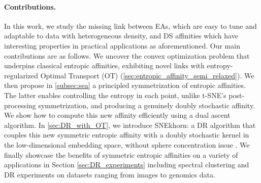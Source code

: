 \paragraph{Contributions.} In this work, we study the missing
link between EAs, which are easy to tune and adaptable to data with heterogeneous density, and DS affinities which have interesting properties in practical applications as aforementioned. 
Our main contributions are as follows. We uncover the convex
optimization problem that underpins classical entropic affinities, exhibiting
novel links with entropy-regularized Optimal Transport (OT) (\cref{sec:entropic_affinity_semi_relaxed}). We then propose in \cref{subsec:sea} a principled symmetrization of entropic
affinities. The latter enables controlling the entropy in each point, unlike
t-SNE's post-processing symmetrization, and producing a genuinely doubly stochastic affinity. We show how to
compute this new affinity efficiently using a dual ascent algorithm.
In \cref{sec:DR_with_OT}, we introduce SNEkhorn: a DR algorithm that couples this new symmetric entropic affinity with a doubly stochastic kernel in the low-dimensional embedding space, without sphere concentration issue \cite{lu2019doubly}. We finally showcase the benefits of symmetric entropic affinities on a variety of applications in Section \ref{sec:DR_experiments} including spectral clustering and DR experiments on datasets ranging from images to genomics data.

